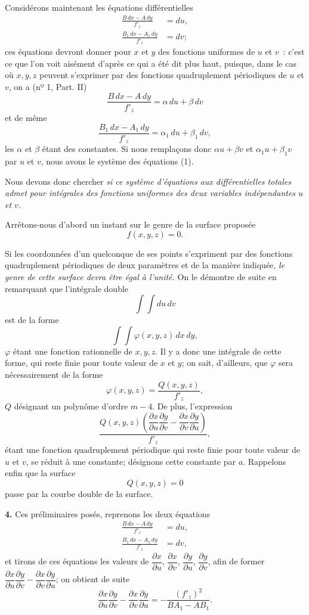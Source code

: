 \documentclass{article}
\begin{document}
Considérons maintenant les équations différentielles
\[
\begin{aligned}
\frac{B\,dx - A\,dy}{f'_{z}} &= du, \\
\frac{B_{1}\,dx - A_{1}\,dy}{f'_{z}} &= dv;
\end{aligned}
\tag{1}
\]
ces équations devront donner pour $x$ et $y$ des fonctions uniformes de
$u$ et $v$~: c'est ce que l'on voit aisément d'après ce qui a été dit plus haut, puisque, dans le cas où $x, y, z$ peuvent s'exprimer par des fonctions quadruplement périodiques de $u$ et $v$, on a (nº 1, Part. II)
\[
\frac{B\,dx - A\,dy}{f'_{z}} = \alpha\,du + \beta\,dv
\]
et de même
\[
\frac{B_{1}\,dx - A_{1}\,dy}{f'_{z}} = \alpha_{1}\,du + \beta_{1}\,dv,
\]
les $\alpha$ et $\beta$ étant des constantes. Si nous remplaçons donc $\alpha u + \beta v$ et $\alpha_{1} u + \beta_{1} v$ par $u$ et $v$, nous avons le système des équations (1).

Nous devons donc chercher \emph{si ce système d'équations aux différentielles totales admet pour intégrales des fonctions uniformes des deux variables indépendantes $u$ et $v$.}

Arrêtons-nous d'abord un instant sur le genre de la surface proposée
\[
f(x, y, z) = 0.
\]

Si les coordonnées d'un quelconque de ses points s'expriment par des fonctions quadruplement périodiques de deux paramètres et de la manière indiquée, \emph{le genre de cette surface devra être égal à l'unité.} On le démontre de suite en remarquant que l'intégrale double
\[
\int \int du\,dv
\]
est de la forme
\[
\int \int \varphi(x, y, z)\,dx\,dy,
\]
$\varphi$ étant une fonction rationnelle de $x, y, z$. Il y a donc une intégrale de cette forme, qui reste finie pour toute valeur de $x$ et $y$; on sait, d'ailleurs, que $\varphi$ sera nécessairement de la forme
\[
\varphi(x, y, z) = \frac{Q(x, y, z)}{f'_{z}},
\]
$Q$ désignant un polynôme d'ordre $m - 4$. De plus, l'expression
\[
\frac{Q(x, y, z)\left(\dfrac{\partial x}{\partial u} \dfrac{\partial y}{\partial v} - \dfrac{\partial x}{\partial v} \dfrac{\partial y}{\partial u}\right)}{f'_{z}},
\]
étant une fonction quadruplement périodique qui reste finie pour toute valeur de $u$ et $v$, se réduit à une constante; désignons cette constante par $a$. Rappelons enfin que la surface
\[
Q(x, y, z) = 0
\]
passe par la courbe double de la surface.

\textbf{4.} Ces préliminaires posés, reprenons les deux équations
\[
\begin{aligned}
\frac{B\,dx - A\,dy}{f'_{z}} &= du, \\
\frac{B_{1}\,dx - A_{1}\,dy}{f'_{z}} &= dv,
\end{aligned}
\]
et tirons de ces équations les valeurs de $\dfrac{\partial x}{\partial u}$, $\dfrac{\partial x}{\partial v}$, $\dfrac{\partial y}{\partial u}$, $\dfrac{\partial y}{\partial v}$, afin de former $\dfrac{\partial x}{\partial u} \dfrac{\partial y}{\partial v} - \dfrac{\partial x}{\partial v} \dfrac{\partial y}{\partial u}$; on obtient de suite
\[
\frac{\partial x}{\partial u} \frac{\partial y}{\partial v} - \frac{\partial x}{\partial v} \frac{\partial y}{\partial u} = -\frac{(f'_{z})^{2}}{BA_{1} - AB_{1}}.
\]
\end{document}

